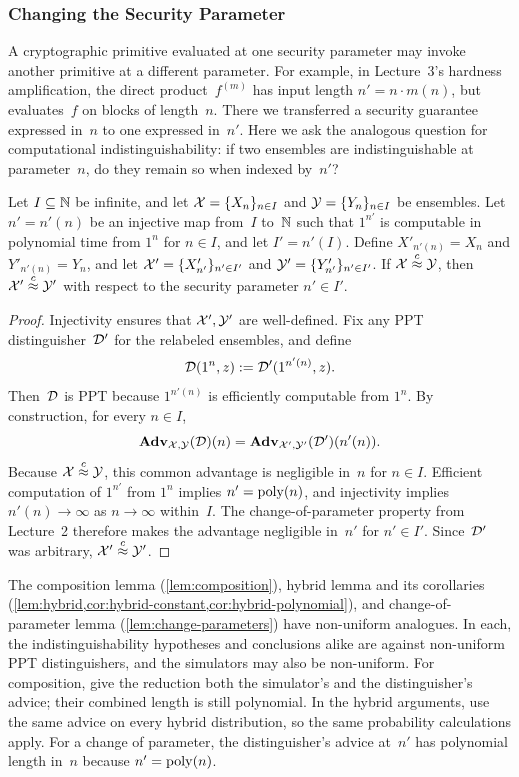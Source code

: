 \documentclass[11pt]{article}
\begin{document}
\subsubsection{Changing the Security Parameter}

A cryptographic primitive evaluated at one security parameter may invoke another primitive at a different parameter.
For example, in Lecture~3's hardness amplification, the direct product~$f^{(m)}$ has input length $n'=n\cdot m(n)$, but evaluates~$f$ on blocks of length~$n$.
There we transferred a security guarantee expressed in~$n$ to one expressed in~$n'$.
Here we ask the analogous question for computational indistinguishability: if two ensembles are indistinguishable at parameter~$n$, do they remain so when indexed by~$n'$?

\begin{lemma}
  \label{lem:change-parameters}
  Let $I\subseteq\mathbb{N}$ be infinite, and let $\mathcal{X} = \{X_{n}\}_{n\in I}$ and $\mathcal{Y} = \{Y_{n}\}_{n\in I}$ be ensembles.
  Let $n'=n'(n)$ be an injective map from~$I$ to~$\mathbb{N}$ such that $1^{n'}$ is computable in polynomial time from $1^{n}$ for $n\in I$, and let $I'=n'(I)$.
  Define $X'_{n'(n)}=X_n$ and $Y'_{n'(n)}=Y_n$, and let $\mathcal{X}'=\{X'_{n'}\}_{n' \in I'}$ and $\mathcal{Y}'=\{Y'_{n'}\}_{n' \in I'}$.
  If $\mathcal{X} \stackrel{c}{\approx} \mathcal{Y}$, then $\mathcal{X}' \stackrel{c}{\approx} \mathcal{Y}'$ with respect to the security parameter $n'\in I'$.
\end{lemma}

\begin{proof}
  Injectivity ensures that $\mathcal{X}',\mathcal{Y}'$ are well-defined.
  Fix any PPT distinguisher~$\mathcal{D}'$ for the relabeled ensembles, and define
  \[
    \mathcal{D}(1^n,z):=\mathcal{D}'(1^{n'(n)},z)\text.
  \]
  Then~$\mathcal{D}$ is PPT because $1^{n'(n)}$ is efficiently computable from $1^n$.
  By construction, for every $n\in I$,
  \[
    \mathbf{Adv}_{\mathcal{X},\mathcal{Y}}(\mathcal{D})(n)
    =\mathbf{Adv}_{\mathcal{X}',\mathcal{Y}'}(\mathcal{D}')(n'(n))\text.
  \]
  Because $\mathcal{X}\stackrel{c}{\approx}\mathcal{Y}$, this common advantage is negligible in~$n$ for $n\in I$.
  Efficient computation of $1^{n'}$ from $1^n$ implies $n'=\operatorname{poly}(n)$, and injectivity implies $n'(n)\to\infty$ as $n\to\infty$ within~$I$.
  The change-of-parameter property from Lecture~2 therefore makes the advantage negligible in~$n'$ for $n'\in I'$.
  Since~$\mathcal{D}'$ was arbitrary, $\mathcal{X}'\stackrel{c}{\approx}\mathcal{Y}'$.
\end{proof}

\begin{remark}
  The composition lemma (\cref{lem:composition}), hybrid lemma and its corollaries (\cref{lem:hybrid,cor:hybrid-constant,cor:hybrid-polynomial}), and change-of-parameter lemma (\cref{lem:change-parameters}) have non-uniform analogues.
  In each, the indistinguishability hypotheses and conclusions alike are against non-uniform PPT distinguishers, and the simulators may also be non-uniform.
  For composition, give the reduction both the simulator's and the distinguisher's advice; their combined length is still polynomial.
  In the hybrid arguments, use the same advice on every hybrid distribution, so the same probability calculations apply.
  For a change of parameter, the distinguisher's advice at~$n'$ has polynomial length in~$n$ because $n'=\operatorname{poly}(n)$.
\end{remark}
\end{document}
